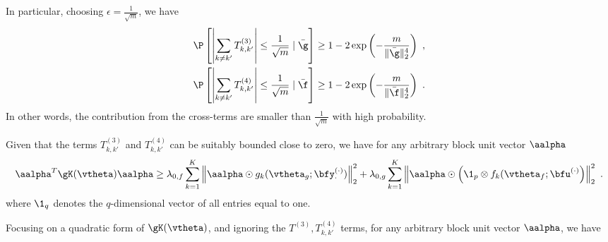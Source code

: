 In particular, choosing $\epsilon = \frac{1}{\sqrt{m}}$, we have 
   \begin{align}
        \P\left[ \left|\sum_{k\neq k'} T^{(3)}_{k,k'} \right| \leq \frac{1}{\sqrt{m}} \mid \bar{\g} \right] & \geq 1 - 2 \exp \left(- \frac{m}{\|\bar{\g}\|_2^4} \right)~, \\
      \P\left[ \left|\sum_{k\neq k'} T^{(4)}_{k,k'} \right| \leq \frac{1}{\sqrt{m}} \mid \bar{\f} \right] & \geq 1 - 2 \exp\left(- \frac{m }{\|\bar{\f}\|_2^4} \right) ~.
    \end{align}
In other words, the contribution from the cross-terms are smaller than $\frac{1}{\sqrt{m}}$ with high probability. 

\begin{prop}\label{prop:quadraticFormNTK}
    Given that the terms $T^{(3)}_{k,k'}$ and $T^{(4)}_{k,k'}$ can be suitably bounded close to zero, we have for any arbitrary block unit vector $\aalpha$ 
\begin{equation}
    \aalpha^T \gK(\vtheta) \aalpha \geq \lambda_{0,f} \sum_{k=1}^K \left\| \aalpha \odot g_k(\vtheta_g; \bfy^{(\cdot)}_{\cdot}) \right\|_2^2  + \lambda_{0,g} \sum_{k=1}^K \left\| \aalpha \odot \left(\1_p \otimes f_k(\vtheta_f; \bfu^{(\cdot)} \right) \right\|_2^2~.
    \label{eq:alphaT_K_alpha_lb}
\end{equation}
where $\1_q$ denotes the $q$-dimensional vector of all entries equal to one.
\end{prop}
\proof
Focusing on a quadratic form of $\gK(\vtheta)$, and ignoring the $T^{(3)}, T^{(4)}_{k,k'}$ terms, for any arbitrary block unit vector $\aalpha$, we have 
